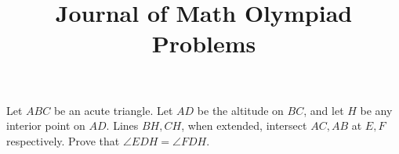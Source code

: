 \documentclass[a4paper, 12pt, oneside]{memoir}
\title{\textbf{Journal of Math Olympiad Problems} \HRule{2pt}\\[.5cm]}
\begin{document}



% 

% 


% 
% 
% 
%
% 
% 
% 
% 
% 
% 
% 
% 
% 
% 	
% 



% 
% 
% 
% 
 
% 



% 
% 
% 
% 
% 
% 
% 
% 
 
 
 {Let $ABC$ be an acute triangle. Let $AD$ be the altitude on $BC$, and let $H$ be any interior point on $AD$. Lines $BH,CH$, when extended, intersect $AC,AB$ at $E,F$ respectively. Prove that $\angle EDH=\angle FDH$.}	
\end{document}
